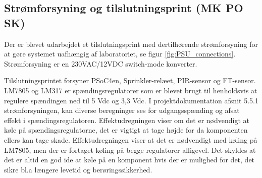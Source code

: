 \subsection{Strømforsyning og tilslutningsprint (MK PO SK)}

Der er blevet udarbejdet et tilslutningsprint med dertilhørende strømforsyning for at gøre systemet uafhængig af laboratoriet, se figur \ref{fig:PSU_connections}. Strømforsyning er en 230VAC/12VDC switch-mode konverter.


Tilslutningsprintet forsyner PSoC4en, Sprinkler-relæet, PIR-sensor og FT-sensor. LM7805 og LM317 er spændingsregulatorer som er blevet brugt til henholdsvis at regulere spændingen ned til 5 Vdc og 3,3 Vdc. I projektdokumentation afsnit 5.5.1 strømforsyningen, kan diverse beregninger ses for udgangsspænding og afsat effekt i spændingsregulatoren. Effektudregningen viser om det er nødvendigt at køle på spændingsregulatorne, det er vigtigt at tage højde for da komponenten ellers kan tage skade. Effektudregningen viser at det er nødvendigt med køling på LM7805, men der er fortaget køling på begge regulatorer alligevel. Det skyldes at det er altid en god ide at køle på en komponent hvis der er mulighed for det, det sikre bl.a længere levetid og berøringssikkerhed.

   